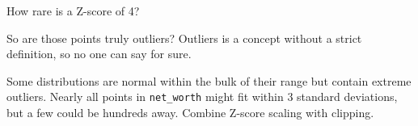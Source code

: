 \begin{frame}{How rare is a Z-score of 4?}
  \begin{withmargin}
    \begin{tdmargin}
      So are those points truly outliers? Outliers is a concept without a strict
      definition, so no one can say for sure.
      \par\medskip
      Some distributions are normal within the bulk of their range but contain
      extreme outliers. Nearly all points in \texttt{net\_worth} might fit within
      3 standard deviations, but a few could be hundreds away. Combine Z-score
      scaling with clipping.
    \end{tdmargin}
  \end{withmargin}
\end{frame}

